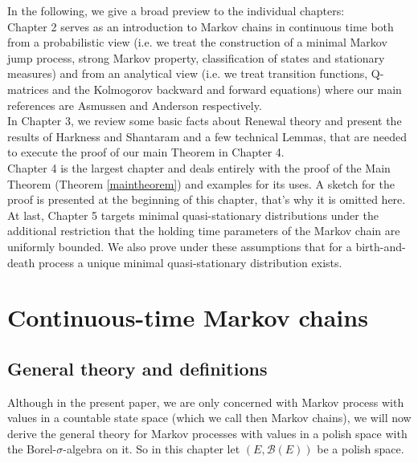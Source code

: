 \documentclass[12pt,a4paper]{scrartcl}
\numberwithin{equation}{section}
\begin{document}
In the following, we give a broad preview to the individual chapters: \\[1em]
Chapter 2 serves as an introduction to Markov chains in continuous time both from a probabilistic view (i.e. we treat the construction of a minimal Markov jump process, strong Markov property, classification of states and stationary measures) and from an analytical view (i.e. we treat transition functions, Q-matrices and the Kolmogorov backward and forward equations) where our main references are Asmussen \cite{asmussen} and Anderson \cite{anderson} respectively.\\

In Chapter 3, we review some basic facts about Renewal theory and present the results of Harkness and Shantaram \cite{harkness} and a few technical Lemmas, that are needed to execute the proof of our main Theorem in Chapter 4. \\

Chapter 4 is the largest chapter and deals entirely with the proof of the Main Theorem (Theorem \ref{maintheorem}) and examples for its uses. A sketch for the proof is presented at the beginning of this chapter, that's why it is omitted here. \\

At last, Chapter 5 targets minimal quasi-stationary distributions under the additional restriction that the holding time parameters of the Markov chain are uniformly bounded. We also prove under these assumptions that for a birth-and-death process a unique minimal quasi-stationary distribution exists.\\[2ex]

\section{Continuous-time Markov chains}


\subsection{General theory and definitions}

Although in the present paper, we are only concerned with Markov process with values in a countable state space (which we call then Markov chains), we will now derive the general theory for Markov processes with values in a polish space with the Borel-$\sigma$-algebra on it.
So in this chapter let $\left(E, \mathcal{B}\left(E\right) \right)$ be a polish space.
\end{document}
